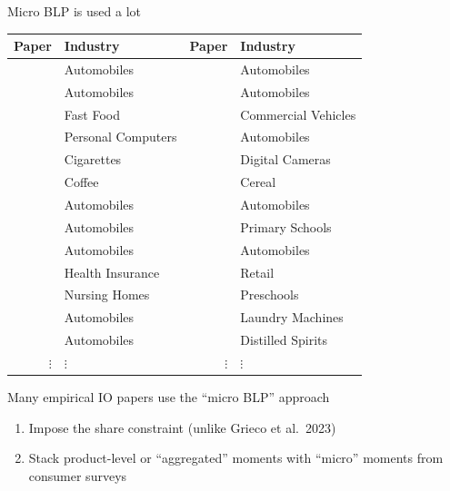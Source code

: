 \begin{frame}{Micro BLP is used a lot}
    \vspace{0.5em}
    \scriptsize
    \begin{tabular}{rlrl}
        Paper & Industry & Paper & Industry \\
        \midrule
        \cite*{petrin2002quantifying} & Automobiles & \cite*{barwick2017local} & Automobiles \\
        \cite*{berry2004differentiated} & Automobiles & \cite*{murry2017advertising} & Automobiles \\
        \cite*{thomadsen2005effect} & Fast Food & \cite*{wollmann2018trucks} & Commercial Vehicles \\
        \cite*{goeree2008limited} & Personal Computers & \cite*{li2018better} & Automobiles \\
        \cite*{ciliberto2010public} & Cigarettes & \cite*{li2018empirical} & Digital Cameras \\
        \cite*{nakamura2010accounting} & Coffee & \cite*{backus2021common} & Cereal \\
        \cite*{beresteanu2011gasoline} & Automobiles & \cite*{grieco2021evolution} & Automobiles \\
        \cite*{li2012traffic} & Automobiles & \cite*{neilson2021targeted} & Primary Schools \\
        \cite*{copeland2014intertemporal} & Automobiles & \cite*{armitage2022regulatory} & Automobiles \\
        \cite*{starc2014insurer} & Health Insurance & \cite*{dopper2022rising} & Retail \\
        \cite*{ching2015quantifying} & Nursing Homes & \cite*{bodere2023dynamic} & Preschools \\
        \cite*{li2015price} & Automobiles & \cite*{montag2023mergers} & Laundry Machines \\
        \cite*{nurski2016exclusive} & Automobiles & \cite*{conlon2023market} & Distilled Spirits \\
        $\vdots$ & $\vdots$ & $\vdots$ & $\vdots$
    \end{tabular}
    \normalsize
    \vspace{0.5em}
    \begin{wideitemize}
        \item Many empirical IO papers use the ``micro BLP'' approach
        \begin{enumerate}
            \item Impose the \cite{berry1995automobile} share constraint (unlike {\color{light gray}Grieco et al.\ 2023}) \nocite{grieco2023conformant}
            \item Stack product-level or ``\alert{aggregated}'' moments with ``\alert{micro}'' moments from consumer surveys
        \end{enumerate}
    \end{wideitemize}
\end{frame}


